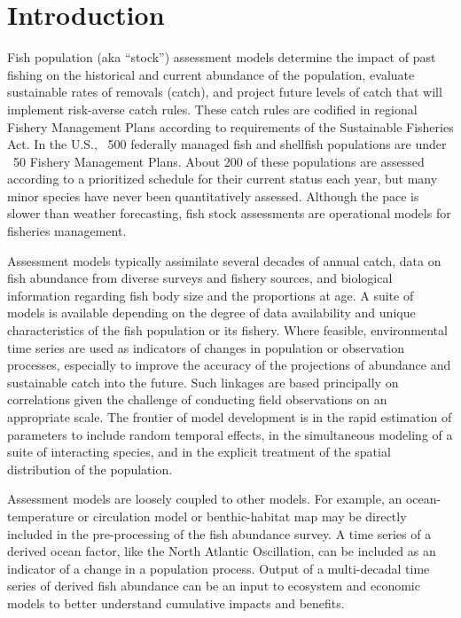 
\section{Introduction}\label{sec:intro}
Fish population (aka “stock”)  assessment models determine the impact of past fishing on the historical and current abundance of the population, evaluate sustainable rates of removals (catch), and project future levels of catch that will implement risk-averse catch rules.  These catch rules are codified in regional Fishery Management Plans according to requirements of the Sustainable Fisheries Act.  In the U.S., ~500 federally managed fish and shellfish populations are under ~50 Fishery Management Plans.  About 200 of these populations are assessed according to a prioritized schedule for their current status each year, but many minor species have never been quantitatively assessed.  Although the pace is slower than weather forecasting, fish stock assessments are operational models for fisheries management.

Assessment models typically assimilate several decades of annual catch, data on fish abundance from diverse surveys and fishery sources, and biological information regarding fish body size and the proportions at age.  A suite of models is available depending on the degree of data availability and unique characteristics of the fish population or its fishery.  Where feasible, environmental time series are used as indicators of changes in population or observation processes, especially to improve the accuracy of the projections of abundance and sustainable catch into the future.  Such linkages are based principally on correlations given the challenge of conducting field observations on an appropriate scale.  The frontier of model development is in the rapid estimation of parameters to include random temporal effects, in the simultaneous modeling of a suite of interacting species, and in the explicit treatment of the spatial distribution of the population.

Assessment models are loosely coupled to other models. For example, an ocean-temperature or circulation model or benthic-habitat map may be directly included in the pre-processing of the fish abundance survey.  A time series of a derived ocean factor, like the North Atlantic Oscillation, can be included as an indicator of a change in a population process.  Output of a multi-decadal time series of derived fish abundance can be an input to ecosystem and economic models to better understand cumulative impacts and benefits. 

